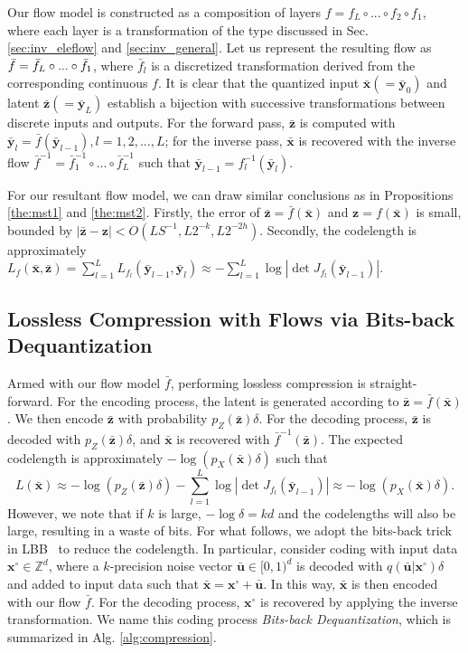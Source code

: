 \documentclass{article}
\newcommand{\qv}[1]{\bar{\mathbf{#1}}}
\begin{document}
Our flow model is constructed as a composition of layers $f = f_L \circ ... \circ f_2 \circ f_1$, where each layer is a transformation of the type discussed in Sec. \ref{sec:inv_eleflow} and \ref{sec:inv_general}. Let us represent the resulting flow as $\Bar{f} = \Bar{f}_L \circ ... \circ \Bar{f}_1$, where $\bar{f}_l$ is a discretized transformation derived from the corresponding continuous $f$. It is clear that the quantized input $\qv{x} (= \qv{y}_0)$ and latent $\qv{z} (= \qv{y}_L)$ establish a bijection with successive transformations between discrete inputs and outputs. For the forward pass, $\qv{z}$ is computed with $\qv{y}_l = \bar{f} (\qv{y}_{l-1}), l = 1, 2, ..., L$; for the inverse pass, $\qv{x}$ is recovered with the inverse flow $\bar{f}^{-1} = \bar{f}^{-1}_1 \circ ... \circ \bar{f}^{-1}_L$ such that $\qv{y}_{l-1} = f^{-1}_l (\qv{y}_l)$.

For our resultant flow model, we can draw similar conclusions as in Propositions \ref{the:mst1} and \ref{the:mst2}. Firstly, the error of $\qv{z} = \bar{f} (\qv{x})$ and $\mathbf{z} = f (\qv{x})$ is small, bounded by $|\qv{z} - \mathbf{z}| < O(LS^{-1}, L2^{-k}, L2^{-2h})$. Secondly, the codelength is approximately $L_f (\qv{x}, \qv{z}) = \sum_{l=1}^L L_{f_l} (\qv{y}_{l-1}, \qv{y}_l) \approx - \sum_{l=1}^L \log |\det J_{f_l} (\qv{y}_{l-1})|$.

\subsection{Lossless Compression with Flows via Bits-back Dequantization}
\label{sec:inv_deq}

Armed with our flow model $\bar{f}$, performing lossless compression is straight-forward. For the encoding process, the latent is generated according to $\qv{z} = \bar{f} (\qv{x})$. We then encode $\qv{z}$ with probability $p_Z (\qv{z}) \delta$. For the decoding process, $\qv{z}$ is decoded with $p_Z (\qv{z}) \delta$, and $\qv{x}$ is recovered with $\bar{f}^{-1} (\qv{z})$. The expected codelength is approximately $- \log (p_X (\qv{x}) \delta)$ such that
\begin{equation}
L(\qv{x}) \approx - \log (p_Z (\qv{z}) \delta) - \sum_{l=1}^L \log |\det J_{f_l} (\qv{y}_{l-1})| \approx  - \log (p_X (\qv{x}) \delta). 
\end{equation}
However, we note that if $k$ is large, $-\log \delta = kd$ and the codelengths will also be large, resulting in a waste of bits. For what follows, we adopt the bits-back trick in LBB~\cite{ho2019compression} to reduce the codelength. In particular, consider coding with input data $\mathbf{x}^\circ \in \mathbb{Z}^d$, where a $k$-precision noise vector $\qv{u} \in [0, 1)^d$ is decoded with $q(\qv{u} | \mathbf{x}^\circ) \delta$ and added to input data such that $\qv{x} = \mathbf{x}^\circ + \qv{u}$. In this way, $\qv{x}$ is then encoded with our flow $\bar{f}$. For the decoding process, $\mathbf{x}^\circ$ is recovered by applying the inverse transformation. We name this coding process \textit{Bits-back Dequantization}, which is summarized in Alg. \ref{alg:compression}.
\end{document}

